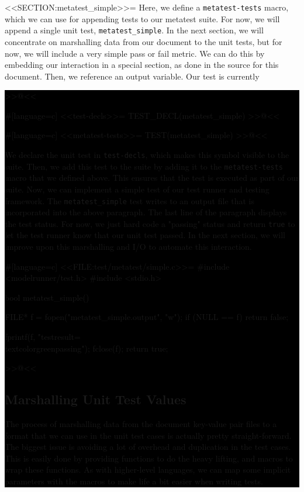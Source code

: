<<SECTION:metatest_simple>>=
Here, we define a \verb/metatest-tests/ macro, which we can use for appending
tests to our metatest suite. For now, we will append a single unit test,
\verb/metatest_simple/. In the next section, we will concentrate on marshalling
data from our document to the unit tests, but for now, we will include a very
simple pass or fail metric.  We can do this by embedding our interaction in a
special section, as done in the source for this document. Then, we reference an
output variable. Our test is currently \colorbox{black}{%
>>@<<

#[language=c]
<<test-decls>>=
TEST_DECL(metatest_simple)
>>@<<

#[language=c]
<<metatest-tests>>=
TEST(metatest_simple)
>>@<<

We declare the unit test in \verb/test-decls/, which makes this symbol
visible to the suite. Then, we add this test to the suite by adding it to the
\verb/metatest-tests/ macro that we defined above. This ensures that the test is
executed as part of our suite.  Now, we can implement a simple test of our test
runner and testing framework.  The \verb/metatest_simple/ test writes to an
output file that is incorporated into the above paragraph. The last line of the
paragraph displays the test status. For now, we just hard code a "passing"
status and return \verb/true/ to let the test runner know that our unit test
passed. In the next section, we will improve upon this marshalling and I/O to
automate this interaction.

#[language=c]
<<FILE:test/metatest/simple.c>>=
#include <modelrunner/test.h>
#include <stdio.h>

bool metatest_simple()
{
    FILE* f = fopen("metatest_simple.output", "w");
    if (NULL == f)
    {
        return false;
    }

    fprintf(f, "testresult=\\textcolor{green}{passing}\n");
    fclose(f);
    return true;
}
>>@<<

\newpage

\subsection{Marshalling Unit Test Values}

The process of marshalling data from the document key-value pair files to a
format that we can use in the unit test cases is actually pretty
straight-forward. The biggest issue is avoiding a lot of overhead and
duplication in the test cases.  This is easily done by providing functions to do
the heavy lifting, and macros to wrap these functions.  As with higher-level
languages, we can map some implicit parameters with the macros to make life a
bit easier when writing tests.

}
